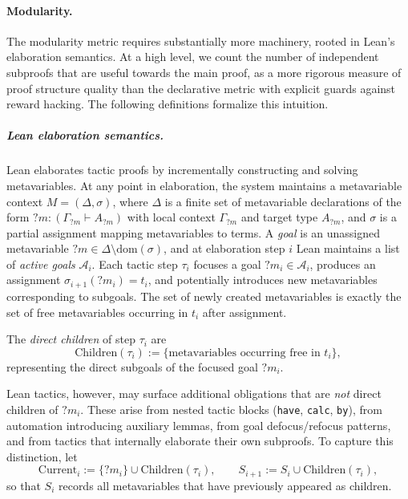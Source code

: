 \paragraph{Modularity.}\label{def:modularity}

The modularity metric requires substantially more machinery, rooted in Lean's elaboration semantics. At a high level, we count the number of independent subproofs that are useful towards the main proof, as a more rigorous measure of proof structure quality than the declarative metric with explicit guards against reward hacking. The following definitions formalize this intuition.

\subparagraph{Lean elaboration semantics.} Lean elaborates tactic proofs by incrementally constructing and solving metavariables. At any point in elaboration, the system maintains a metavariable context $M = (\Delta, \sigma)$, where $\Delta$ is a finite set of metavariable declarations of the form $?m : (\Gamma_{?m} \vdash A_{?m})$ with local context $\Gamma_{?m}$ and target type $A_{?m}$, and $\sigma$ is a partial assignment mapping metavariables to terms. A \emph{goal} is an unassigned metavariable $?m \in \Delta \setminus \mathrm{dom}(\sigma)$, and at elaboration step $i$ Lean maintains a list of \emph{active goals} $\mathcal{A}_i$. Each tactic step $\tau_i$ focuses a goal $?m_i \in \mathcal{A}_i$, produces an assignment $\sigma_{i+1}(?m_i) = t_i$, and potentially introduces new metavariables corresponding to subgoals. The set of newly created metavariables is exactly the set of free metavariables occurring in $t_i$ after assignment.

\begin{definition}\label{def:proof_tree}
The \emph{direct children} of step $\tau_i$ are
\[
\mathrm{Children}(\tau_i) := \{\text{metavariables occurring free in } t_i\},
\]
representing the direct subgoals of the focused goal $?m_i$.
\end{definition}

Lean tactics, however, may surface additional obligations that are \emph{not} direct children of $?m_i$. These arise from nested tactic blocks (\texttt{have}, \texttt{calc}, \texttt{by}), from automation introducing auxiliary lemmas, from goal defocus/refocus patterns, and from tactics that internally elaborate their own subproofs. To capture this distinction, let
\[
\mathrm{Current}_i := \{?m_i\} \cup \mathrm{Children}(\tau_i),\qquad S_{i+1} := S_i \cup \mathrm{Children}(\tau_i),
\]
so that $S_i$ records all metavariables that have previously appeared as children.

